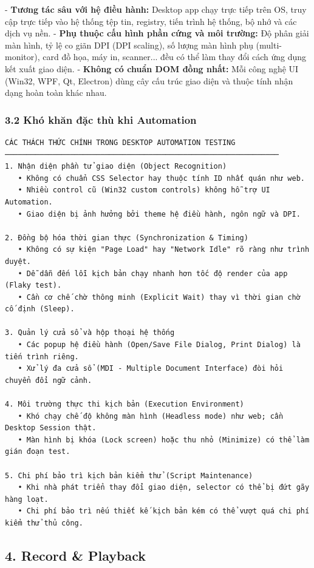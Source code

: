 - \textbf{Tương tác sâu với hệ điều hành:} Desktop app chạy trực tiếp trên OS, truy cập trực tiếp vào hệ thống tệp tin, registry, tiến trình hệ thống, bộ nhớ và các dịch vụ nền.
- \textbf{Phụ thuộc cấu hình phần cứng và môi trường:} Độ phân giải màn hình, tỷ lệ co giãn DPI (DPI scaling), số lượng màn hình phụ (multi-monitor), card đồ họa, máy in, scanner... đều có thể làm thay đổi cách ứng dụng kết xuất giao diện.
- \textbf{Không có chuẩn DOM đồng nhất:} Mỗi công nghệ UI (Win32, WPF, Qt, Electron) dùng cây cấu trúc giao diện và thuộc tính nhận dạng hoàn toàn khác nhau.

\subsubsection{3.2 Khó khăn đặc thù khi Automation}

\begin{lstlisting}
CÁC THÁCH THỨC CHÍNH TRONG DESKTOP AUTOMATION TESTING
───────────────────────────────────────────────────────────────
1. Nhận diện phần tử giao diện (Object Recognition)
   • Không có chuẩn CSS Selector hay thuộc tính ID nhất quán như web.
   • Nhiều control cũ (Win32 custom controls) không hỗ trợ UI Automation.
   • Giao diện bị ảnh hưởng bởi theme hệ điều hành, ngôn ngữ và DPI.

2. Đồng bộ hóa thời gian thực (Synchronization & Timing)
   • Không có sự kiện "Page Load" hay "Network Idle" rõ ràng như trình duyệt.
   • Dễ dẫn đến lỗi kịch bản chạy nhanh hơn tốc độ render của app (Flaky test).
   • Cần cơ chế chờ thông minh (Explicit Wait) thay vì thời gian chờ cố định (Sleep).

3. Quản lý cửa sổ và hộp thoại hệ thống
   • Các popup hệ điều hành (Open/Save File Dialog, Print Dialog) là tiến trình riêng.
   • Xử lý đa cửa sổ (MDI - Multiple Document Interface) đòi hỏi chuyển đổi ngữ cảnh.

4. Môi trường thực thi kịch bản (Execution Environment)
   • Khó chạy chế độ không màn hình (Headless mode) như web; cần Desktop Session thật.
   • Màn hình bị khóa (Lock screen) hoặc thu nhỏ (Minimize) có thể làm gián đoạn test.

5. Chi phí bảo trì kịch bản kiểm thử (Script Maintenance)
   • Khi nhà phát triển thay đổi giao diện, selector có thể bị đứt gãy hàng loạt.
   • Chi phí bảo trì nếu thiết kế kịch bản kém có thể vượt quá chi phí kiểm thử thủ công.
\end{lstlisting}



\subsection{4. Record \& Playback}

